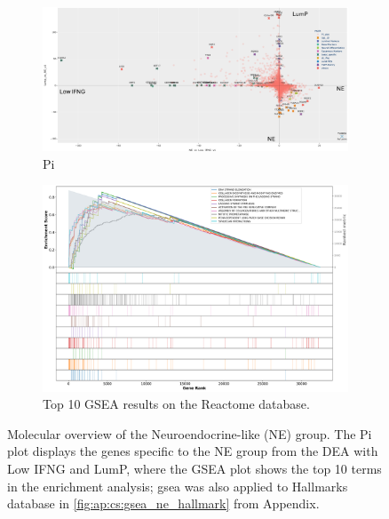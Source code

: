 \begin{figure}[!htb]
    \centering
    \begin{subfigure}[!t]{1.0\textwidth}
        \includegraphics[width=\textwidth,keepaspectratio]{Sections/ClusteringAnalysis/Resources/discussion/other_groups/ne_pi.png}    
        \caption{Pi}
        \label{fig:cs:ne_pi}
    \end{subfigure}
    \centering
    \begin{subfigure}[!t]{0.9\textwidth}
        \includegraphics[width=\textwidth, keepaspectratio]{Sections/ClusteringAnalysis/Resources/discussion/other_groups/ne2_reactome_10_top.png}
        \caption{Top 10 GSEA results on the Reactome database.}
        \label{fig:cs:ne_gsea}
    \end{subfigure} 
    \centering
    \caption{Molecular overview of the Neuroendocrine-like (NE) group. The Pi plot displays the genes specific to the NE group from the DEA with Low IFNG and LumP, where the GSEA plot shows the top 10 terms in the enrichment analysis; \acrshort{gsea} was also applied to Hallmarks database in \cref{fig:ap:cs:gsea_ne_hallmark} from Appendix.} 
    \label{fig:cs:ne}
\end{figure}

